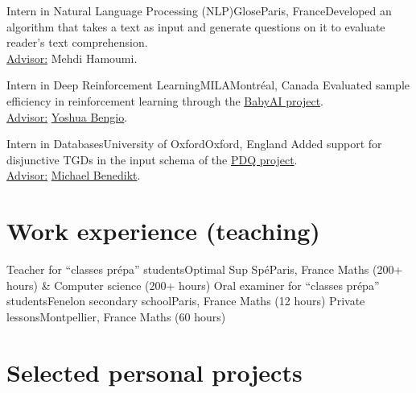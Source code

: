 \documentclass[colorlinks,linkcolor=true]{moderncv}
\begin{document}
{Intern in Natural Language Processing (NLP)}{Glose}{Paris, France}{}{Developed an algorithm that takes a text as input and generate questions on it to evaluate reader's text comprehension. \\
\underline{Advisor:} Mehdi Hamoumi.}

{Intern in Deep Reinforcement Learning}{MILA}{Montréal, Canada}{}
{Evaluated sample efficiency in reinforcement learning through the \href{https://github.com/maximecb/baby-ai-game}{BabyAI project}. \\
\underline{Advisor:} \href{https://www.iro.umontreal.ca/~bengioy/yoshua_en/index.html}{Yoshua Bengio}.}

{Intern in Databases}{University of Oxford}{Oxford, England}{}
{Added support for disjunctive TGDs in the input schema of the \href{http://www.cs.ox.ac.uk/projects/pdq/home.html}{PDQ project}. \\
\underline{Advisor:} \href{http://www.cs.ox.ac.uk/michael.benedikt/home.html}{Michael Benedikt}.}

\section{Work experience (teaching)}

{Teacher for ``classes prépa'' students}{Optimal Sup Spé}{Paris, France}{}
{Maths (200+ hours) \& Computer science (200+ hours)}
{Oral examiner for ``classes prépa'' students}{Fenelon secondary school}{Paris, France}{}
{Maths (12 hours)}
{Private lessons}{}{Montpellier, France}{}
{Maths (60 hours)}

\newpage

\section{Selected personal projects}
\end{document}
